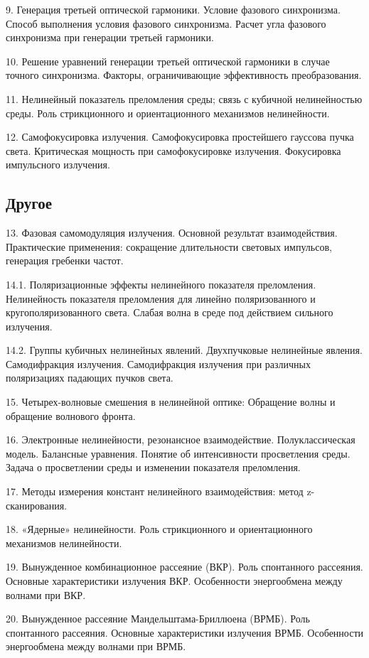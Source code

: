 9. Генерация третьей оптической гармоники. Условие фазового синхронизма. Способ выполнения условия фазового синхронизма. Расчет угла фазового синхронизма при генерации третьей гармоники.

10. Решение уравнений генерации третьей оптической гармоники в случае точного синхронизма. Факторы, ограничивающие эффективность преобразования.

11. Нелинейный показатель преломления среды; связь с кубичной нелинейностью среды. Роль стрикционного и ориентационного механизмов нелинейности.

12. Самофокусировка излучения. Самофокусировка простейшего гауссова пучка света. Критическая мощность при самофокусировке излучения. Фокусировка импульсного излучения.


\subsection*{Другое}

13. Фазовая самомодуляция излучения. Основной результат взаимодействия. Практические применения: сокращение длительности световых импульсов, генерация гребенки частот.

14.1. Поляризационные эффекты нелинейного показателя преломления. Нелинейность показателя преломления для линейно поляризованного и кругополяризованного света. Слабая волна в среде под действием сильного излучения.

14.2. Группы кубичных нелинейных явлений. Двухпучковые нелинейные явления. Самодифракция излучения. Самодифракция излучения при различных поляризациях падающих пучков света.

15. Четырех-волновые смешения в нелинейной оптике: Обращение волны и обращение волнового фронта.

16. Электронные нелинейности, резонансное взаимодействие. Полуклассическая модель. Балансные уравнения. Понятие об интенсивности просветления среды. Задача о просветлении среды и изменении показателя преломления.

17. Методы измерения констант нелинейного взаимодействия: метод z-сканирования.

18. «Ядерные» нелинейности. Роль стрикционного и ориентационного механизмов нелинейности.

19. Вынужденное комбинационное рассеяние (ВКР). Роль спонтанного рассеяния. Основные характеристики излучения ВКР. Особенности энергообмена между волнами при ВКР.

20. Вынужденное рассеяние Мандельштама-Бриллюена (ВРМБ). Роль спонтанного рассеяния. Основные характеристики излучения ВРМБ. Особенности энергообмена между волнами при ВРМБ.